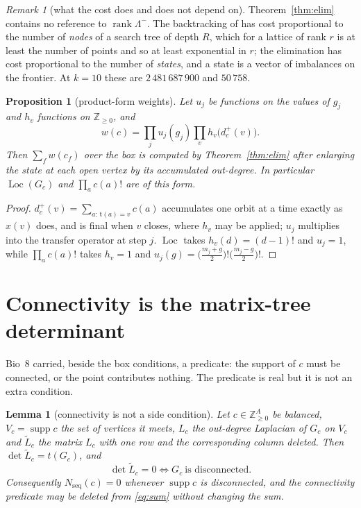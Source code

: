 \documentclass[11pt]{article}
\theoremstyle{plain}
\newtheorem{proposition}[theorem]{Proposition}
\newtheorem{lemma}[theorem]{Lemma}
\theoremstyle{definition}
\theoremstyle{remark}
\newtheorem{remark}[theorem]{Remark}
\newcommand{\Z}{\mathbb{Z}}
\newcommand{\rank}{\operatorname{rank}}
\newcommand{\supp}{\operatorname{supp}}
\newcommand{\Loc}{\operatorname{Loc}}
\newcommand{\Nseq}{N_{\mathrm{seq}}}
\newcommand{\Lm}{\Lambda^{-}}
\begin{document}
\begin{remark}[what the cost does and does not depend on]\label{rem:cost}
Theorem~\ref{thm:elim} contains no reference to $\rank\Lm$. The backtracking of \cite{Bio8}
has cost proportional to the number of \emph{nodes} of a search tree of depth $R$, which for a
lattice of rank $r$ is at least the number of points and so at least exponential in $r$; the
elimination has cost proportional to the number of \emph{states}, and a state is a vector of
imbalances on the frontier. At $k=10$ these are $2\,481\,687\,900$ and $50\,758$.
\end{remark}

\begin{proposition}[product-form weights]\label{prop:weights}
Let $u_j$ be functions on the values of $g_j$ and $h_v$ functions on $\Z_{\ge0}$, and
\[
w(c)=\prod_j u_j(g_j)\prod_v h_v\big(d^+_c(v)\big).
\]
Then $\sum_f w(c_f)$ over the box is computed by Theorem~\ref{thm:elim} after enlarging the
state at each open vertex by its accumulated out-degree. In particular
$\Loc(G_c)$ and $\prod_a c(a)!$ are of this form.
\end{proposition}

\begin{proof}
$d^+_c(v)=\sum_{a:\,\mathrm{t}(a)=v}c(a)$ accumulates one orbit at a time exactly as $x(v)$
does, and is final when $v$ closes, where $h_v$ may be applied; $u_j$ multiplies into the
transfer operator at step $j$. $\Loc$ takes $h_v(d)=(d-1)!$ and $u_j=1$, while
$\prod_a c(a)!$ takes $h_v=1$ and $u_j(g)=\big(\tfrac{m_j+g}{2}\big)!\big(\tfrac{m_j-g}{2}\big)!$.
\end{proof}

\section{Connectivity is the matrix-tree determinant}\label{sec:conn}

Bio~8 carried, beside the box conditions, a predicate: the support of $c$ must be connected,
or the point contributes nothing. The predicate is real but it is not an extra condition.

\begin{lemma}[connectivity is not a side condition]\label{lem:conn}
Let $c\in\Z_{\ge0}^A$ be balanced, $V_c=\supp c$ the set of vertices it meets, $L_c$ the
out-degree Laplacian of $G_c$ on $V_c$ and $\widetilde L_c$ the matrix $L_c$ with one row and
the corresponding column deleted. Then $\det\widetilde L_c=t(G_c)$, and
\[
\det\widetilde L_c=0\iff G_c\ \text{is disconnected.}
\]
Consequently $\Nseq(c)=0$ whenever $\supp c$ is disconnected, and the connectivity predicate
may be deleted from \eqref{eq:sum} without changing the sum.
\end{lemma}
\end{document}

